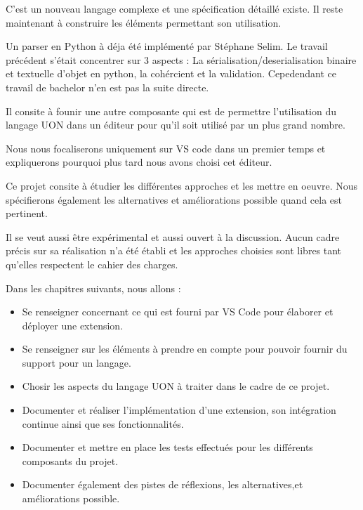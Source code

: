 \documentclass[
    iict, %
    il, %
]{heig-tb}
\begin{document}
C'est un nouveau langage complexe et une spécification détaillé existe. Il reste maintenant à construire les éléments permettant son utilisation.


Un parser en Python à déja été implémenté par Stéphane Selim.
Le travail précédent s'était concentrer sur 3 aspects : La sérialisation/deserialisation binaire et textuelle d'objet en python, la cohércient et la validation.
Cepedendant ce travail de bachelor n'en est pas la suite directe.

Il consite à founir une autre composante qui est de permettre l'utilisation du langage UON dans un éditeur pour qu'il soit utilisé par un plus grand nombre.

Nous nous focaliserons uniquement sur VS code dans un premier temps et expliquerons pourquoi plus tard nous avons choisi cet éditeur.

Ce projet consite à étudier les différentes approches et les mettre en oeuvre. Nous spécifierons également les alternatives et améliorations possible quand cela est pertinent.

Il se veut aussi être expérimental et aussi ouvert à la discussion.
Aucun cadre précis sur sa réalisation n'a été établi et les approches choisies sont libres tant qu'elles respectent le cahier des charges.

Dans les chapitres suivants, nous allons :

\begin{itemize}
    \item Se renseigner concernant ce qui est fourni par VS Code pour élaborer et déployer une extension.
    \item Se renseigner sur les éléments à prendre en compte pour pouvoir fournir du support pour un langage.
    \item Chosir les aspects du langage UON à traiter dans le cadre de ce projet.
    \item Documenter et réaliser l'implémentation d'une extension, son intégration continue ainsi que ses fonctionnalités.
    \item Documenter et mettre en place les tests effectués pour les différents composants du projet.
    \item Documenter également des pistes de réflexions, les alternatives,et améliorations possible.
\end{itemize}
\end{document}

